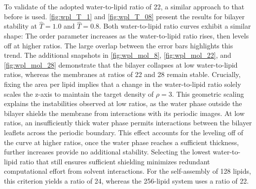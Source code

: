 \documentclass[
    11pt,
    a4paper,
    oneside,        %
    BCOR=10mm,      %
    parskip=half,   %
    listof=nototoc,   %
    bibliography=totoc %
]{scrreprt}
\begin{document}
To validate of the adopted water-to-lipid ratio of 22, a similar approach to that before is used. \cref{fig:wpl_T_1} and \cref{fig:wpl_T_08} present the results for bilayer stability at $\hat{T}=1.0$ and $\hat{T}=0.8$. Both water-to-lipid ratio curves exhibit a similar shape: The order parameter increases as the water-to-lipid ratio rises, then levels off at higher ratios. The large overlap between the error bars highlights this trend. The additional snapshots in \cref{fig:wpl_mol_8}, \cref{fig:wpl_mol_22}, and \cref{fig:wpl_mol_28} demonstrate that the bilayer collapses at low water-to-lipid ratios, whereas the membranes at ratios of 22 and 28 remain stable. Crucially, fixing the area per lipid implies that a change in the water-to-lipid ratio solely scales the z-axis to maintain the target density of $\rho=3$. This geometric scaling explains the instabilities observed at low ratios, as the water phase outside the bilayer shields the membrane from interactions with its periodic images. At low ratios, an insufficiently thick water phase permits interactions between the bilayer leaflets across the periodic boundary. This effect accounts for the leveling off of the curve at higher ratios, once the water phase reaches a sufficient thickness, further increases provide no additional stability. Selecting the lowest water-to-lipid ratio that still ensures sufficient shielding minimizes redundant computational effort from solvent interactions. For the self-assembly of 128 lipids, this criterion yields a ratio of 24, whereas the 256-lipid system uses a ratio of 22.
\end{document}
